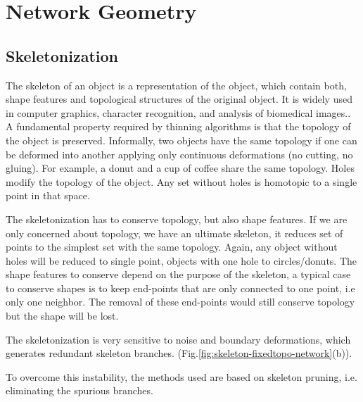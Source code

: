 
\chapter{Network Geometry} %

\label{Chapter-Network} %


\section{Skeletonization}

The skeleton of an object is a representation of the object, which contain both,
shape features and topological structures of the original object. It is widely
used in computer graphics, character recognition, and analysis of biomedical
images.\citep{bai_skeleton_2007,golland_fixed_2000,ge_generation_1996}. A fundamental property required by thinning algorithms is that the topology of the object is preserved. Informally, two objects have the same topology if one can be deformed into another applying only continuous deformations (no cutting, no gluing). For example, a donut and a cup of coffee share the same topology. Holes modify the topology of the object. Any set without holes is homotopic to a single point in that space.

The skeletonization has to conserve topology, but also shape features. If we are only concerned about topology, we have an ultimate skeleton, it reduces set of points to the simplest set with the same topology. Again, any object without holes will be reduced to single point, objects with one hole to circles/donuts. The shape features to conserve depend on the purpose of the skeleton, a typical case to conserve shapes is to keep end-points that are only connected to one point, i.e only one neighbor. The removal of these end-points would still conserve topology but the shape will be lost.

The skeletonization is very sensitive to noise and boundary deformations, which generates redundant skeleton branches. (Fig.\ref{fig:skeleton-fixedtopo-network}(b)).

To overcome this instability, the methods used are based on skeleton pruning, i.e. eliminating the spurious branches.

